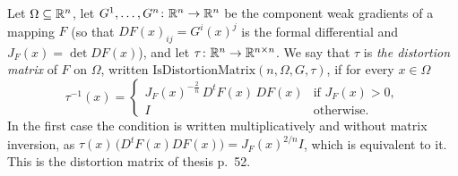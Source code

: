 \begin{definition}
Let $\Omega\subseteq\mathbb{R}^n$, let $G^1,\dots,G^n\colon\mathbb{R}^n\to\mathbb{R}^n$ be the component
weak gradients of a mapping $F$ (so that $DF(x)_{ij}=G^i(x)^j$ is the formal
differential and $J_F(x)=\det DF(x)$), and let
$\tau\colon\mathbb{R}^n\to\mathbb{R}^{n\times n}$.  We say that $\tau$ is \emph{the distortion
matrix} of $F$ on $\Omega$, written $\mathrm{IsDistortionMatrix}(n,\Omega,G,\tau)$,
if for every $x\in\Omega$
\[
\tau^{-1}(x)=
\begin{cases}
J_F(x)^{-\frac2n}\,D^tF(x)\,DF(x) & \text{if }J_F(x)>0,\\
I & \text{otherwise.}
\end{cases}
\]
In the first case the condition is written multiplicatively and without matrix
inversion, as
$\tau(x)\,\bigl(D^tF(x)DF(x)\bigr)=J_F(x)^{2/n}I$, which is equivalent to it.
This is the distortion matrix of thesis p.~52.
\end{definition}
